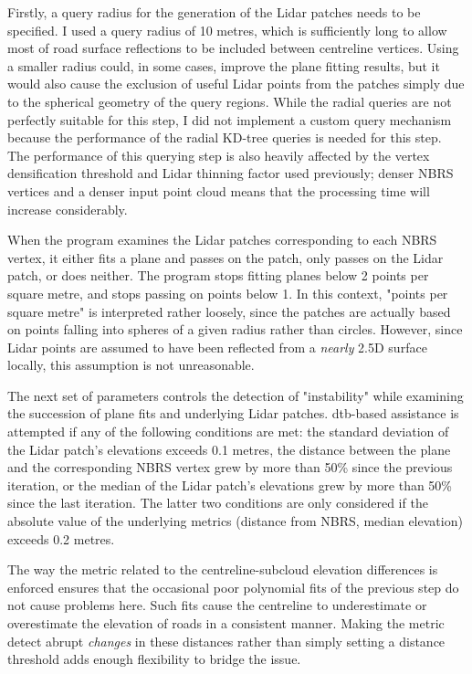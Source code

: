 Firstly, a query radius for the generation of the Lidar patches needs to be specified. I used a query radius of 10 metres, which is sufficiently long to allow most of road surface reflections to be included between centreline vertices. Using a smaller radius could, in some cases, improve the plane fitting results, but it would also cause the exclusion of useful Lidar points from the patches simply due to the spherical geometry of the query regions. While the radial queries are not perfectly suitable for this step, I did not implement a custom query mechanism because the performance of the radial KD-tree queries is needed for this step. The performance of this querying step is also heavily affected by the vertex densification threshold and Lidar thinning factor used previously; denser NBRS vertices and a denser input point cloud means that the processing time will increase considerably.

When the program examines the Lidar patches corresponding to each NBRS vertex, it either fits a plane and passes on the patch, only passes on the Lidar patch, or does neither. The program stops fitting planes below 2 points per square metre, and stops passing on points below 1. In this context, "points per square metre" is interpreted rather loosely, since the patches are actually based on points falling into spheres of a given radius rather than circles. However, since Lidar points are assumed to have been reflected from a \textit{nearly} 2.5D surface locally, this assumption is not unreasonable.

The next set of parameters controls the detection of "instability" while examining the succession of plane fits and underlying Lidar patches. \ac{dtb}-based assistance is attempted if any of the following conditions are met: the standard deviation of the Lidar patch's elevations exceeds 0.1 metres, the distance between the plane and the corresponding NBRS vertex grew by more than 50\% since the previous iteration, or the median of the Lidar patch's elevations grew by more than 50\% since the last iteration. The latter two conditions are only considered if the absolute value of the underlying metrics (distance from NBRS, median elevation) exceeds 0.2 metres.

The way the metric related to the centreline-subcloud elevation differences is enforced ensures that the occasional poor polynomial fits of the previous step do not cause problems here. Such fits cause the centreline to underestimate or overestimate the elevation of roads in a consistent manner. Making the metric detect abrupt \textit{changes} in these distances rather than simply setting a distance threshold adds enough flexibility to bridge the issue.

